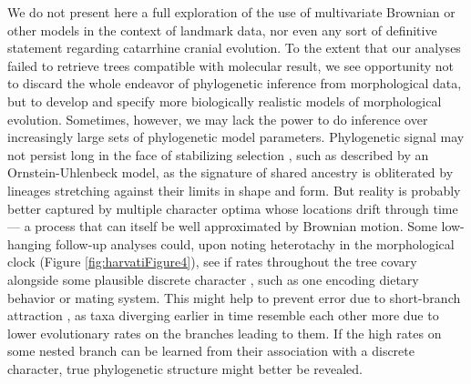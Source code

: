 \documentclass[10pt, twocolumn, twoside]{article}
\begin{document}
We do not present here a full exploration of the use of multivariate Brownian or other models in the context of landmark data, nor even any sort of definitive statement regarding catarrhine cranial evolution. To the extent that our analyses failed to retrieve trees compatible with molecular result, we see opportunity not to discard the whole endeavor of phylogenetic inference from morphological data, but to develop and specify more biologically realistic models of morphological evolution. Sometimes, however, we may lack the power to do inference over increasingly large sets of phylogenetic model parameters. Phylogenetic signal may not persist long in the face of stabilizing selection \citep{varon-gonzalezEstimatingPhylogeniesShape2020}, such as described by an Ornstein-Uhlenbeck model, as the signature of shared ancestry is obliterated by lineages stretching against their limits in shape and form. But reality is probably better captured by multiple character optima whose locations drift through time --- a process that can itself be well approximated by Brownian motion. Some low-hanging follow-up analyses could, upon noting heterotachy in the morphological clock (Figure \ref{fig:harvatiFigure4}), see if rates throughout the tree covary alongside some plausible discrete character \citep{mayBayesianApproachInferring2020}, such as one encoding dietary behavior or mating system. This might help to prevent error due to short-branch attraction \citep{philippeHeterotachyLongbranchAttraction2005}, as taxa diverging earlier in time resemble each other more due to lower evolutionary rates on the branches leading to them. If the high rates on some nested branch can be learned from their association with a discrete character, true phylogenetic structure might better be revealed. 
\end{document}
